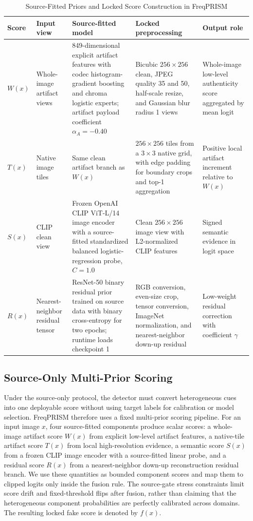 \documentclass[lettersize,journal]{IEEEtran}
\begin{document}
\begin{table}[t]
\caption{Source-Fitted Priors and Locked Score Construction in FreqPRISM}
\label{tab:component_priors}
\centering
\footnotesize
\renewcommand{\arraystretch}{1.12}
\setlength{\tabcolsep}{3pt}
\begin{tabular}{p{}p{}p{}p{}p{}}
\toprule
Score & Input view & Source-fitted model & Locked preprocessing & Output role \\
\midrule
$W(x)$ & Whole-image artifact views & 849-dimensional explicit artifact features with codec histogram-gradient boosting and chroma logistic experts; artifact payload coefficient $\alpha_A=-0.40$ & Bicubic $256\times256$ clean, JPEG quality 35 and 50, half-scale resize, and Gaussian blur radius 1 views & Whole-image low-level authenticity score aggregated by mean logit \\
$T(x)$ & Native image tiles & Same clean artifact branch as $W(x)$ & $256\times256$ tiles from a $3\times3$ native grid, with edge padding for boundary crops and top-1 aggregation & Positive local artifact increment relative to $W(x)$ \\
$S(x)$ & CLIP clean view & Frozen OpenAI CLIP ViT-L/14 image encoder with a source-fitted standardized balanced logistic-regression probe, $C=1.0$ & Clean $256\times256$ image view with L2-normalized CLIP features & Signed semantic evidence in logit space \\
$R(x)$ & Nearest-neighbor residual tensor & ResNet-50 binary residual prior trained on source data with binary cross-entropy for two epochs; runtime loads checkpoint 1 & RGB conversion, even-size crop, tensor conversion, ImageNet normalization, and nearest-neighbor down-up residual & Low-weight residual correction with coefficient $\gamma$ \\
\bottomrule
\end{tabular}
\end{table}

\subsection{Source-Only Multi-Prior Scoring}
\label{sec:method_scoring}

Under the source-only protocol, the detector must convert heterogeneous cues into one deployable score without using target labels for calibration or model selection. FreqPRISM therefore uses a fixed multi-prior scoring pipeline. For an input image $x$, four source-fitted components produce scalar scores: a whole-image artifact score $W(x)$ from explicit low-level artifact features, a native-tile artifact score $T(x)$ from local high-resolution evidence, a semantic score $S(x)$ from a frozen CLIP image encoder with a source-fitted linear probe, and a residual score $R(x)$ from a nearest-neighbor down-up reconstruction residual branch. We use these quantities as bounded component scores and map them to clipped logits only inside the fusion rule. The source-gate stress constraints limit score drift and fixed-threshold flips after fusion, rather than claiming that the heterogeneous component probabilities are perfectly calibrated across domains. The resulting locked fake score is denoted by $f(x)$.
\end{document}
